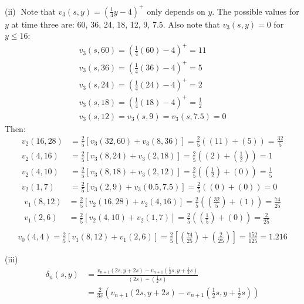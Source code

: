 \documentclass[12pt, letterpaper]{article}
\begin{document}
\rightline{$\square$}

\vspace{5mm}
\noindent
(ii)$\;$ Note that $v_3(s,y) = \left( \tfrac{1}{4}y-4 \right)^+$ only depends on $y$. The possible values for $y$ at time three are: 60, 36, 24, 18, 12, 9, 7.5. Also note that $v_3(s,y) = 0$ for $y \leq 16$:
\begin{gather*}
    v_3(s, 60) = \left(\tfrac{1}{4}(60)-4 \right)^+ = 11 \\
    v_3(s, 36) = \left(\tfrac{1}{4}(36)-4 \right)^+ = 5 \\
    v_3(s, 24) = \left(\tfrac{1}{4}(24)-4 \right)^+ = 2 \\
    v_3(s, 18) = \left(\tfrac{1}{4}(18)-4 \right)^+ = \tfrac{1}{2} \\
    v_3(s, 12) = v_3(s, 9) = v_3(s, 7.5) = 0
\end{gather*}
Then:
\begin{align*}
    v_2(16,28) &= \tfrac{2}{5}\left[v_{3}(32, 60) + v_{3}\left(8, 36\right)\right] = \tfrac{2}{5}((11)+(5)) = \tfrac{32}{5} \\
    v_2(4,16) &= \tfrac{2}{5}\left[v_{3}(8, 24) + v_{3}\left(2, 18\right)\right] = \tfrac{2}{5}\left((2)+\left(\tfrac{1}{2}\right)\right) = 1 \\
    v_2(4,10) &= \tfrac{2}{5}\left[v_{3}(8, 18) + v_{3}\left(2, 12\right)\right] = \tfrac{2}{5}\left(\left(\tfrac{1}{2}\right) + (0)\right) = \tfrac{1}{5} \\
    v_2(1,7) &= \tfrac{2}{5}\left[v_{3}(2, 9) + v_{3}\left(0.5, 7.5\right)\right] = \tfrac{2}{5}\left((0)+(0)\right) = 0
\end{align*}
\begin{align*}
    v_1(8, 12) &= \tfrac{2}{5}\left[v_{2}(16, 28) + v_{2}\left(4, 16\right)\right] = \tfrac{2}{5}\left(\left(\tfrac{32}{5}\right) + (1)\right) = \tfrac{74}{25} \\
    v_1(2, 6) &= \tfrac{2}{5}\left[v_{2}(4, 10) + v_{2}\left(1, 7\right)\right] = \tfrac{2}{5}\left(\left(\tfrac{1}{5}\right) + (0)\right) = \tfrac{2}{25} \\
\end{align*}
\begin{gather*}
    v_0(4,4) = \tfrac{2}{5}\left[ v_1(8,12) + v_1(2,6) \right] = \tfrac{2}{5}\left[ \left(\tfrac{74}{25}\right) + \left(\tfrac{2}{25}\right) \right] = \tfrac{152}{125} = 1.216
\end{gather*}

\rightline{$\square$}

\vspace{5mm}
\noindent
(iii)$\;$
\begin{align*}
    \delta_n(s,y) &= \frac{v_{n+1}(2s, y+2s) - v_{n+1}\left(\tfrac{1}{2}s, y+\tfrac{1}{2}s\right)}{(2s) - \left(\tfrac{1}{2}s\right)} \\ &= \frac{2}{3s}\left( v_{n+1}(2s, y+2s) - v_{n+1}\left(\tfrac{1}{2}s, y+\tfrac{1}{2}s\right) \right)
\end{align*}
\end{document}
